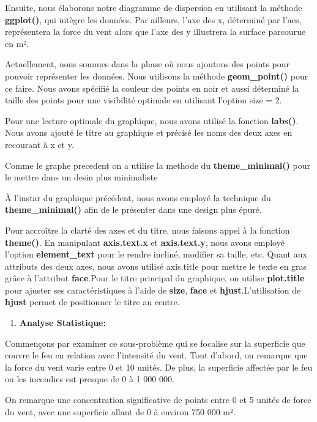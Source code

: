 \documentclass[
]{article}
\providecommand{\tightlist}{%
  \setlength{\itemsep}{0pt}\setlength{\parskip}{0pt}}
\begin{document}
Ensuite, nous élaborons notre diagramme de dispersion en utilisant la
méthode \textbf{ggplot()}, qui intègre les données. Par ailleurs, l'axe
des x, déterminé par l'aes, représentera la force du vent alors que
l'axe des y illustrera la surface parcourue en m².

Actuellement, nous sommes dans la phase où nous ajoutons des points pour
pouvoir représenter les données. Nous utilisons la méthode
\textbf{geom\_point()} pour ce faire. Nous avons spécifié la couleur des
points en noir et aussi déterminé la taille des points pour une
visibilité optimale en utilisant l'option size = 2.

Pour une lecture optimale du graphique, nous avons utilisé la fonction
\textbf{labs()}. Nous avons ajouté le titre au graphique et précisé les
noms des deux axes en recourant à x et y.

Comme le graphe precedent on a utilise la methode du
\textbf{theme\_minimal()} pour le mettre dans un desin plus minimaliste

À l'instar du graphique précédent, nous avons employé la technique du
\textbf{theme\_minimal()} afin de le présenter dans une design plus
épuré.

Pour accroître la clarté des axes et du titre, nous faisons appel à la
fonction \textbf{theme()}. En manipulant \textbf{axis.text.x} et
\textbf{axis.text.y}, nous avons employé l'option \textbf{element\_text}
pour le rendre incliné, modifier sa taille, etc. Quant aux attributs des
deux axes, nous avons utilisé axis.title pour mettre le texte en gras
grâce à l'attribut \textbf{face}.Pour le titre principal du graphique,
on utilise \textbf{plot.title} pour ajuster ses caractéristiques à
l'aide de \textbf{size}, \textbf{face} et \textbf{hjust}.L'utilisation
de \textbf{hjust} permet de positionner le titre au centre.

\begin{enumerate}
\def\labelenumi{\arabic{enumi}.}
\setcounter{enumi}{1}
\tightlist
\item
  \textbf{Analyse Statistique:}
\end{enumerate}

Commençons par examiner ce sous-problème qui se focalise sur la
superficie que couvre le feu en relation avec l'intensité du vent. Tout
d'abord, on remarque que la force du vent varie entre 0 et 10 unités. De
plus, la superficie affectée par le feu ou les incendies est presque de
0 à 1 000 000.

On remarque une concentration significative de points entre 0 et 5
unités de force du vent, avec une superficie allant de 0 à environ 750
000 m².
\end{document}
